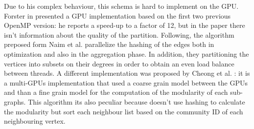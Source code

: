 Due to his complex behaviour, this schema is hard to implement on the GPU.\\
Forster in \cite{forster2016louvain} presented a GPU implementation based on the first two previous OpenMP version: he reports a speed-up to a factor of 12, but in the paper there isn't information about the quality of the partition. Following, the algorithm preposed form Naim et al. \cite{naim2017community} parallelize the hashing of the edges both in optimization and also in the aggregation phase. In addition, they partitioning the vertices into subsets on their degrees in order to obtain an even load balance between threads.
A different implementation was proposed by Cheong et al. \cite{cheong2013hierarchical}: it is a multi-GPUs implementation that used a coarse grain model between the GPUs and than a fine grain model for the computation of the modularity of each sub-graphs. This algorithm its also peculiar because doesn't use hashing to calculate the modularity but sort each neighbour list
based on the community ID of each neighbouring vertex.
